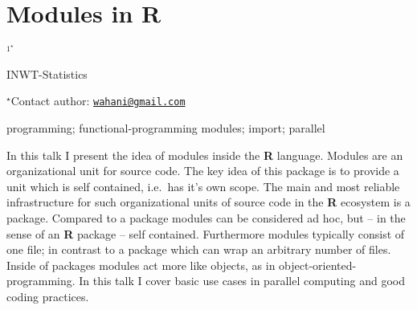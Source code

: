 \documentclass[\main/boa.tex]{subfiles}
\begin{document}
\section{Modules in R}

\begin{center}
  {\bf {}$^{1^\star}$}
\end{center}

\vskip 0.3cm

\begin{affiliations}
\begin{enumerate}
\begin{minipage}{0.915\textwidth}
\centering
\item INWT-Statistics \\[-2pt]
\end{minipage}
\end{enumerate}
$^\star$Contact author: \href{mailto:wahani@gmail.com}{\nolinkurl{wahani@gmail.com}}\\
\end{affiliations}

\vskip 0.5cm

\begin{minipage}{0.915\textwidth}
\keywords programming; functional-programming
\packages modules; import; parallel
\end{minipage}

\vskip 0.8cm

In this talk I present the idea of modules inside the \textbf{R}
language. Modules are an organizational unit for source code. The key
idea of this package is to provide a unit which is self contained,
i.e.~has it's own scope. The main and most reliable infrastructure for
such organizational units of source code in the \textbf{R} ecosystem is
a package. Compared to a package modules can be considered ad hoc, but
-- in the sense of an \textbf{R} package -- self contained. Furthermore
modules typically consist of one file; in contrast to a package which
can wrap an arbitrary number of files. Inside of packages modules act
more like objects, as in object-oriented-programming. In this talk I
cover basic use cases in parallel computing and good coding practices.
\end{document}
